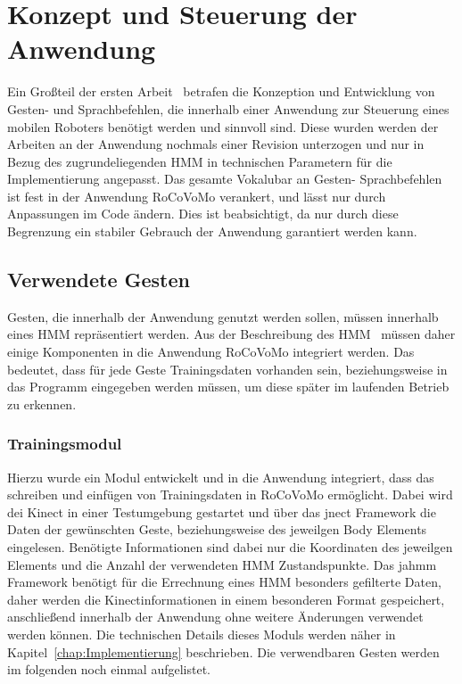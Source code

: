 \chapter{Konzept und Steuerung der Anwendung}
\label{chap:Konzept}

Ein Gro\ss teil der ersten Arbeit~\cite{bib:Ebner_Werling} betrafen die Konzeption und Entwicklung von Gesten- und Sprachbefehlen, die innerhalb einer Anwendung zur Steuerung eines mobilen Roboters ben\"otigt werden und sinnvoll sind. Diese wurden werden der Arbeiten an der Anwendung nochmals einer Revision unterzogen und nur in Bezug des zugrundeliegenden \gls{HMM} in technischen Parametern f\"ur die Implementierung angepasst.
\newline
Das gesamte Vokalubar an Gesten- Sprachbefehlen ist fest in der Anwendung RoCoVoMo verankert, und l\"asst nur durch Anpassungen im Code \"andern. Dies ist beabsichtigt, da nur durch diese Begrenzung ein stabiler Gebrauch der Anwendung garantiert werden kann.

\section{Verwendete Gesten}
Gesten, die innerhalb der Anwendung genutzt werden sollen, m\"ussen innerhalb eines \gls{HMM} repr\"asentiert werden. Aus der Beschreibung des \gls{HMM}~\cite{bib:Ebner_Werling} m\"ussen daher einige Komponenten in die Anwendung RoCoVoMo integriert werden. Das bedeutet, dass f\"ur jede Geste Trainingsdaten vorhanden sein, beziehungsweise in das Programm eingegeben werden m\"ussen, um diese sp\"ater im laufenden Betrieb zu erkennen.

\subsection{Trainingsmodul}
Hierzu wurde ein Modul entwickelt und in die Anwendung integriert, dass das schreiben und einf\"ugen von Trainingsdaten in RoCoVoMo erm\"oglicht. Dabei wird dei Kinect in einer Testumgebung gestartet und \"uber das jnect Framework die Daten der gew\"unschten Geste, beziehungsweise des jeweilgen Body Elements eingelesen. Ben\"otigte Informationen sind dabei nur die Koordinaten des jeweilgen Elements und die Anzahl der verwendeten HMM Zustandspunkte. Das jahmm Framework ben\"otigt f\"ur die Errechnung eines \gls{HMM} besonders gefilterte Daten, daher werden die Kinectinformationen in einem besonderen Format gespeichert, anschlie\ss end innerhalb der Anwendung ohne weitere \"Anderungen verwendet werden k\"onnen. Die technischen Details dieses Moduls werden n\"aher in Kapitel~\ref{chap:Implementierung} beschrieben.
\newline
Die verwendbaren Gesten werden im folgenden noch einmal aufgelistet.

